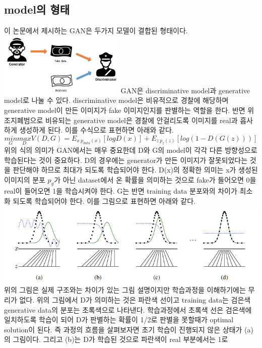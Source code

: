 \documentclass[extendedabs]{bmvc2k}
\begin{document}
 \subsection{model의 형태\cite{youtube_GAN}}
 \quad 이 논문에서 제시하는 GAN은 두가지 모델이 결합된 형태이다.
 \newline  \includegraphics[width=6cm]{images/05_DCGAN.PNG}
 \newline GAN은 discriminative model과 generative model로 나눌 수 있다. discriminative model은 비유적으로 경찰에 해당하며 generative model이 만든 이미지가 
 fake 이미지인지를 판별하는 역할을 한다. 반면 위조지폐범으로 비유되는 generative model은 경찰에 안걸리도록 이미지를 real과 흡사하게 생성하게 된다.
 이를 수식으로 표현하면 아래와 같다. 
 $$ \underset{G}{min}\underset{D}{max}V(D,G) = E_{x ~ p_{data}(x)}[log D(x)] + E_{z~p_z(z)}[log(1-D(G(z)))] $$
 위의 식의 의미가 GAN에서는 매우 중요한데 D와 G의 model이 각각 다른 방향성으로 학습된다는 것이 중요하다. 
 D의 경우에는 generator가 만든 이미지가 잘못되었다는 것을 판단해야 하므로 최대가 되도록 학습되어야 한다. D(x)의 정확한 의미는 x가 생성된 이미지의 분포 $p_g$가 아닌 
 dataset에서 온 확률을 의미하는 것으로 fake가 들어오면 0을 real이 들어오면 1을 학습시켜야 한다. G는 반면 training data 분포와의 차이가 최소화 되도록 학습되어야 한다.
 이를 그림으로 표현하면 아래와 같다.
 \newline  \includegraphics[width=\linewidth]{images/06_GAN.PNG}
 위의 그림은 실제 구조와는 차이가 있는 그림 설명이지만 학습과정을 이해하기에는 무리가 없다. 
 위의 그림에서 D가 의미하는 것은 파란색 선이고 training data는 검은색 generative data의 분포는 초록색으로 나타낸다. 
 학습과정에서 초록색 선은 검은색에 일치하도록 학습이 되어 D가 판별하는 확률이 1/2로 판별을 못할때가 optimal solution이 된다.
 즉 과정의 흐름을 살펴보자면 초기 학습이 진행되지 않은 상태가 (a)의 그림이다. 그리고 (b)는 D가 학습된 것으로 파란색이 real 부분에서는 1로
\end{document}
